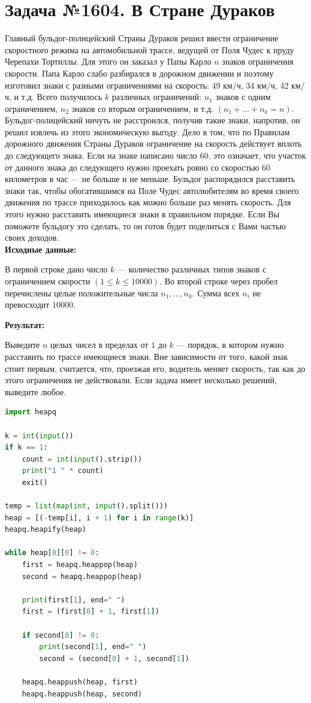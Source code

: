 \documentclass[a4paper,12pt]{article}
\begin{document}
\section{Задача №1604. В Стране Дураков}
Главный бульдог-полицейский Страны Дураков решил ввести ограничение скоростного режима на автомобильной трассе, ведущей от Поля Чудес к пруду Черепахи Тортиллы. Для этого он заказал у Папы Карло $n$ знаков ограничения скорости. Папа Карло слабо разбирался в дорожном движении и поэтому изготовил знаки с разными ограничениями на скорость: 49 км/ч, 34 км/ч, 42 км/ч, и т.д. Всего получилось $k$ различных ограничений: $n_1$ знаков с одним ограничением, $n_2$ знаков со вторым ограничением, и т.д. $(n_1 + \dots + n_k = n)$.\\[0.5em]
Бульдог-полицейский ничуть не расстроился, получив такие знаки, напротив, он решил извлечь из этого экономическую выгоду. Дело в том, что по Правилам дорожного движения Страны Дураков ограничение на скорость действует вплоть до следующего знака. Если на знаке написано число 60, это означает, что участок от данного знака до следующего нужно проехать ровно со скоростью 60 километров в час — не больше и не меньше. Бульдог распорядился расставить знаки так, чтобы обогатившимся на Поле Чудес автолюбителям во время своего движения по трассе приходилось как можно больше раз менять скорость. Для этого нужно расставить имеющиеся знаки в правильном порядке. Если Вы поможете бульдогу это сделать, то он готов будет поделиться с Вами частью своих доходов.\\[1em]
\textbf{Исходные данные:}
\begin{quotebox}
    В первой строке дано число $k$ — количество различных типов знаков с ограничением скорости $(1 \leq k \leq 10000)$. Во второй строке через пробел перечислены целые положительные числа $n_1,\dots, n_k$. Сумма всех $n_i$ не превосходит $10000$.
\end{quotebox}
\textbf{Результат:}
\begin{quotebox}
    Выведите $n$ целых чисел в пределах от $1$ до $k$ — порядок, в котором нужно расставить по трассе имеющиеся знаки. Вне зависимости от того, какой знак стоит первым, считается, что, проезжая его, водитель меняет скорость, так как до этого ограничения не действовали. Если задача имеет несколько решений, выведите любое.
\end{quotebox}
\begin{lstlisting}[language=python]
import heapq

k = int(input())
if k == 1:
    count = int(input().strip())
    print("1 " * count)
    exit()

temp = list(map(int, input().split()))
heap = [(-temp[i], i + 1) for i in range(k)]
heapq.heapify(heap)

while heap[0][0] != 0:
    first = heapq.heappop(heap)
    second = heapq.heappop(heap)

    print(first[1], end=" ")
    first = (first[0] + 1, first[1])  

    if second[0] != 0:
        print(second[1], end=" ")
        second = (second[0] + 1, second[1])

    heapq.heappush(heap, first)
    heapq.heappush(heap, second)
\end{lstlisting}
\end{document}
